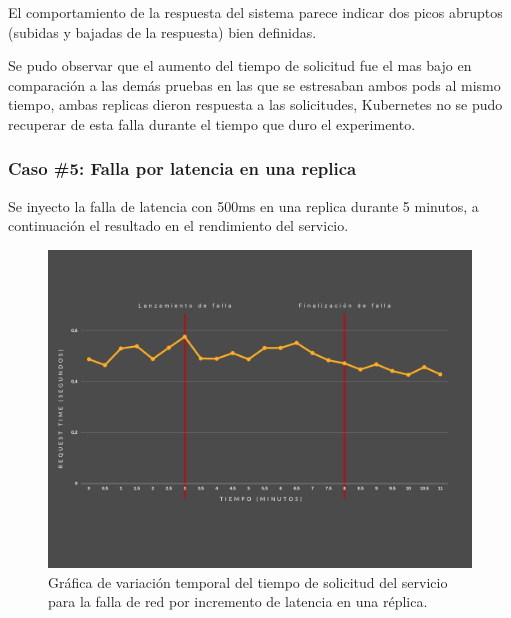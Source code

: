\par El comportamiento de la respuesta del sistema parece indicar dos picos abruptos (subidas y bajadas de la respuesta) bien definidas.\\

\par Se pudo observar que el aumento del tiempo de solicitud fue el mas bajo en comparación a las demás pruebas en las que se estresaban ambos pods al mismo tiempo, ambas replicas dieron respuesta a las solicitudes, Kubernetes no se pudo recuperar de esta falla durante el tiempo que duro el experimento.\\

\subsubsection{Caso \#5: Falla por latencia en una replica}

\par Se inyecto la falla de latencia con 500ms en una replica durante 5 minutos, a continuación el resultado en el rendimiento del servicio.\\



\begin{figure}[htpb!]
	\centering
	\includegraphics[width=0.95\columnwidth]{images/graficasexperimentos/latencia1.png}
	\caption{Gráfica de variación temporal del tiempo de solicitud del servicio para la falla de red por incremento de latencia en una r\'eplica.}
	\label{fig:latencia01}
\end{figure}


